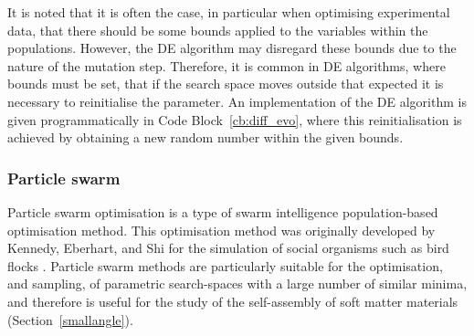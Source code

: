 It is noted that it is often the case, in particular when optimising experimental data, that there should be some bounds applied to the variables within the populations.
However, the DE algorithm may disregard these bounds due to the nature of the mutation step.
Therefore, it is common in DE algorithms, where bounds must be set, that if the search space moves outside that expected it is necessary to reinitialise the parameter.
An implementation of the DE algorithm is given programmatically in Code Block~\ref{cb:diff_evo}, where this reinitialisation is achieved by obtaining a new random number within the given bounds.
%
\begin{figure}
        
\end{figure}
%
%
\begin{figure}
    \centering
        
\end{figure}
%
%
\begin{figure}
    \centering
        
\end{figure}
%
%
\begin{figure}
    \centering
        
\end{figure}
%

\subsubsection{Particle swarm}
\label{sec:partswarm}
Particle swarm optimisation is a type of swarm intelligence population-based optimisation method.
This optimisation method was originally developed by Kennedy, Eberhart, and Shi for the simulation of social organisms such as bird flocks \cite{kennedy_particle_1995,shi_modified_1998}.
Particle swarm methods are particularly suitable for the optimisation, and sampling, of parametric search-spaces with a large number of similar minima, and therefore is useful for the study of the self-assembly of soft matter materials (Section~\ref{smallangle}).

